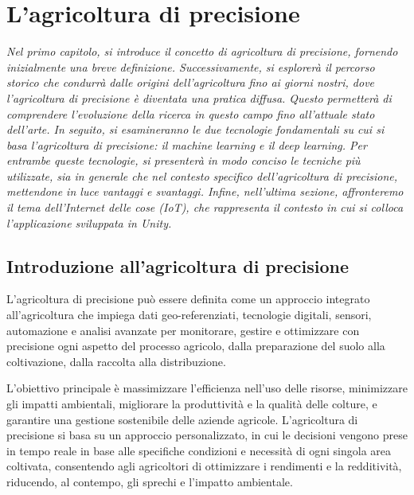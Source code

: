 \chapter{L'agricoltura di precisione}

\begin{preamble}
{\em Nel primo capitolo, si introduce il concetto di agricoltura di precisione, fornendo inizialmente una breve definizione. Successivamente, si esplorerà il percorso storico che condurrà dalle origini dell'agricoltura fino ai giorni nostri, dove l'agricoltura di precisione è diventata una pratica diffusa. Questo  permetterà di comprendere l'evoluzione della ricerca in questo campo fino all'attuale stato dell'arte. \newline \indent In seguito, si esamineranno le due tecnologie fondamentali su cui si basa l'agricoltura di precisione: il machine learning e il deep learning. Per entrambe queste tecnologie, si presenterà in modo conciso le tecniche più utilizzate, sia in generale che nel contesto specifico dell'agricoltura di precisione, mettendone in luce vantaggi e svantaggi. \newline \indent Infine, nell'ultima sezione, affronteremo il tema dell'Internet delle cose (IoT), che rappresenta il contesto in cui si colloca l'applicazione sviluppata in Unity.
}
\end{preamble}

\section{Introduzione all'agricoltura di precisione}

L'agricoltura di precisione può essere definita come un approccio integrato all'agricoltura che impiega dati geo-referenziati, tecnologie digitali, sensori, automazione e analisi avanzate per monitorare, gestire e ottimizzare con precisione ogni aspetto del processo agricolo, dalla preparazione del suolo alla coltivazione, dalla raccolta alla distribuzione. 

L'obiettivo principale è massimizzare l'efficienza nell'uso delle risorse, minimizzare gli impatti ambientali, migliorare la produttività e la qualità delle colture, e garantire una gestione sostenibile delle aziende agricole. L'agricoltura di precisione si basa su un approccio personalizzato, in cui le decisioni vengono prese in tempo reale in base alle specifiche condizioni e necessità di ogni singola area coltivata, consentendo agli agricoltori di ottimizzare i rendimenti e la redditività, riducendo, al contempo, gli sprechi e l'impatto ambientale.

